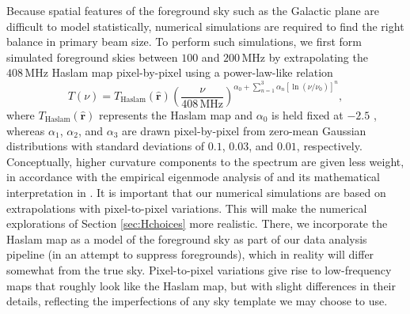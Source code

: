 \documentclass[twocolumn,apj,numberedappendix]{emulateapj}
\newcommand{\rhat}{\hat{\mathbf{r}}}
\begin{document}
Because spatial features of the foreground sky such as the Galactic plane are difficult to model statistically, numerical simulations are required to find the right balance in primary beam size. To perform such simulations, we first form simulated foreground skies between $100$ and $200\,\textrm{MHz}$ by extrapolating the $408\,\textrm{MHz}$ Haslam map \citep{Haslam_408MHz_map} pixel-by-pixel using a power-law-like relation
\begin{equation}
\label{eq:HaslamExtrap}
T(\nu) = T_\textrm{Haslam} (\rhat) \left( \frac{\nu}{408\,\textrm{MHz}}\right)^{\alpha_0 + \sum_{n=1}^{3} \alpha_n \left[ \ln \left(\nu / \nu_0 \right) \right]^n},
\end{equation}
where $T_\textrm{Haslam} (\rhat)$ represents the Haslam map and $\alpha_0$ is held fixed at $-2.5$ \citep{Liu_21cm_Fg}, whereas $\alpha_1$, $\alpha_2$, and $\alpha_3$ are drawn pixel-by-pixel from zero-mean Gaussian distributions with standard deviations of $0.1$, $0.03$, and $0.01$, respectively. Conceptually, higher curvature components to the spectrum are given less weight, in accordance with the empirical eigenmode analysis of \citet{angelicaGSM} and its mathematical interpretation in \citet{Liu_21cm_Fg}. It is important that our numerical simulations are based on extrapolations with pixel-to-pixel variations. This will make the numerical explorations of Section \ref{sec:Hchoices} more realistic. There, we incorporate the Haslam map as a model of the foreground sky as part of our data analysis pipeline (in an attempt to suppress foregrounds), which in reality will differ somewhat from the true sky. Pixel-to-pixel variations give rise to low-frequency maps that roughly look like the Haslam map, but with slight differences in their details, reflecting the imperfections of any sky template we may choose to use.
\end{document}
